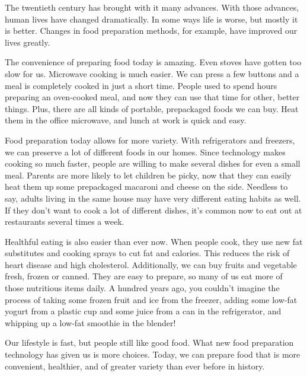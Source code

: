 \documentclass[UTF8]{ctexart}
\begin{document}
\normalsize{The twentieth century has brought with it many advances. With those advances, human lives have changed dramatically. In some ways life is worse, but mostly it is better. Changes in food preparation methods, for example, have improved our lives greatly.

The convenience of preparing food today is amazing. Even stoves have gotten too slow for us. Microwave cooking is much easier. We can press a few buttons and a meal is completely cooked in just a short time. People used to spend hours preparing an oven-cooked meal, and now they can use that time for other, better things. Plus, there are all kinds of portable, prepackaged foods we can buy. Heat them in the office microwave, and lunch at work is quick and easy.

Food preparation today allows for more variety. With refrigerators and freezers, we can preserve a lot of different foods in our homes. Since technology makes cooking so much faster, people are willing to make several dishes for even a small meal. Parents are more likely to let children be picky, now that they can easily heat them up some prepackaged macaroni and cheese on the side. Needless to say, adults living in the same house may have very different eating habits as well. If they don’t want to cook a lot of different dishes, it’s common now to eat out at restaurants several times a week.

Healthful eating is also easier than ever now. When people cook, they use new fat substitutes and cooking sprays to cut fat and calories. This reduces the risk of heart disease and high cholesterol. Additionally, we can buy fruits and vegetable fresh, frozen or canned. They are easy to prepare, so many of us eat more of those nutritious items daily. A hundred years ago, you couldn’t imagine the process of taking some frozen fruit and ice from the freezer, adding some low-fat yogurt from a plastic cup and some juice from a can in the refrigerator, and whipping up a low-fat smoothie in the blender!

Our lifestyle is fast, but people still like good food. What new food preparation technology has given us is more choices. Today, we can prepare food that is more convenient, healthier, and of greater variety than ever before in history.}
\end{document}
